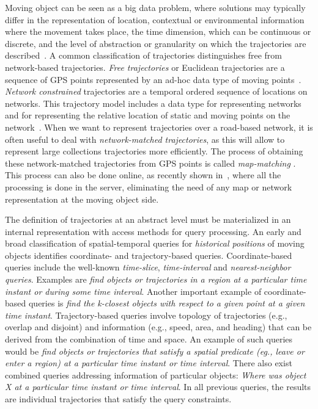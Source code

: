 \documentclass[a4paper,10pt,twoside]{book}
\begin{document}
    Moving object can be seen as a big data problem, where solutions may typically differ in the representation of location, contextual or environmental information where the movement takes place, the time dimension, which can be continuous or discrete, and the level of abstraction or granularity on which the trajectories are described~\cite{DBLP:journals/sigspatial/DamianiIGV15}. A common classification of trajectories distinguishes free from network-based trajectories.  \textit{Free trajectories} or Euclidean trajectories are a sequence of GPS points represented by an ad-hoc data type of moving points~\cite{DBLP:conf/ssdbm/WolfsonXCJ98,DBLP:conf/icde/SistlaWCD97,DBLP:journals/tods/GutingBEJLSV00}. \textit{Network constrained} trajectories are a temporal ordered sequence of locations on networks. This trajectory model includes a data type for representing  networks and  for representing the relative location of static and moving  points on the network~\cite{DBLP:journals/vldb/GutingAD06}. When we want to represent trajectories over a road-based network, it is often useful to deal with \textit{network-matched trajectories}, as this will allow to represent large collections trajectories more efficiently. The process of obtaining these network-matched trajectories from GPS points is called \textit{map-matching} \cite{brakatsoulas2005map}. This process can also be done online, as recently shown in~\cite{DBLP:journals/tits/Ding0GL15}, where all the processing is done in the server, eliminating the need of any map or network representation at the moving object side.
    
    The definition of trajectories at an abstract level must be materialized in an internal representation with access methods for query processing. An early and broad classification of spatial-temporal queries for \textit{historical positions} of moving objects \cite{DBLP:conf/vldb/PfoserJT00} identifies coordinate- and trajectory-based queries. Coordinate-based queries include the well-known  {\it time-slice}, {\it time-interval} and \textit{nearest-neighbor queries}. Examples are \textit{find objects or trajectories in a region at a  particular time instant or during some time interval}. Another important example of coordinate-based queries is \textit{find the k-closest objects with respect to a given point at a given time instant}. Trajectory-based queries  involve topology of trajectories (e.g., overlap and disjoint) and information (e.g., speed, area, and heading) that can be derived from the combination of time and space. An example of such queries would be  \textit{find objects or trajectories that satisfy a spatial predicate (eg., leave or enter a region)  at a particular time instant or time interval}. There also exist combined queries addressing information of particular objects: \textit{Where was object X at a particular time instant or time interval}. In all previous queries, the results are individual trajectories that satisfy the query constraints.
    
\end{document}
